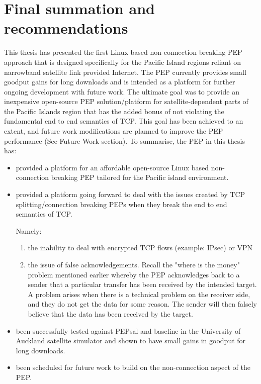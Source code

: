 \section{Final summation and recommendations}

This thesis has presented the first Linux based non-connection breaking PEP approach that is designed specifically for the Pacific Island regions reliant on narrowband satellite link provided Internet. The PEP currently provides small goodput gains for long downloads and is intended as a platform for further ongoing development with future work. The ultimate goal was to provide an inexpensive open-source PEP solution/platform for satellite-dependent parts of the Pacific Islands region that has the added bonus of not violating the fundamental end to end semantics of TCP. This goal has been achieved to an extent, and future work modifications are planned to improve the PEP performance (See Future Work section). To summarise, the PEP in this thesis has:

\begin{itemize}
\item provided a platform for an affordable open-source Linux based non-connection breaking PEP tailored for the Pacific island environment.
\item provided a platform going forward to deal with the issues created by TCP splitting/connection breaking PEPs when they break the end to end semantics of TCP. 

Namely:

  \begin{enumerate}
   \item the inability to deal with encrypted TCP flows      (example: IPsec) or VPN 
   \item the issue of false acknowledgements. Recall the     "where is the money" problem mentioned earlier whereby the PEP acknowledges back to a sender that a particular transfer has been received by the intended target. A problem arises when there is a technical problem on the receiver side, and they do not get the data for some reason. The sender will then falsely believe that the data has been received by the target.
  \end{enumerate}

\item been successfully tested against PEPsal and baseline in the University of Auckland satellite simulator and shown to have small gains in goodput for long downloads.
\item been scheduled for future work to build on the non-connection aspect of the PEP.
\end{itemize}

